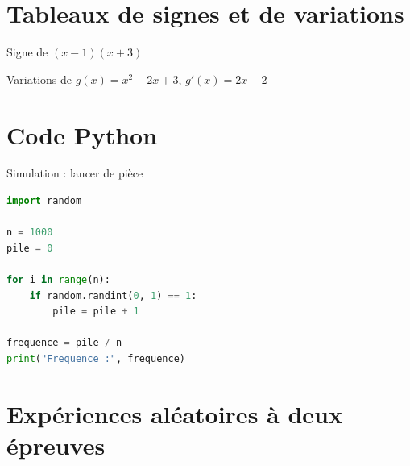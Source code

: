 \section{Tableaux de signes et de variations}

\begin{ex}{Signe de $(x-1)(x+3)$}
	\begin{center}
	\end{center}
\end{ex}

\begin{ex}{Variations de $g(x)=x^2-2x+3$, $g'(x)=2x-2$}
	\begin{center}
	\end{center}
\end{ex}

\section{Code Python}

\begin{ex}{Simulation : lancer de pièce}
	\begin{lstlisting}[language=Python]
import random

n = 1000
pile = 0

for i in range(n):
    if random.randint(0, 1) == 1:
        pile = pile + 1

frequence = pile / n
print("Frequence :", frequence)
	\end{lstlisting}
\end{ex}

\newpage

\section{Expériences aléatoires à deux épreuves}

